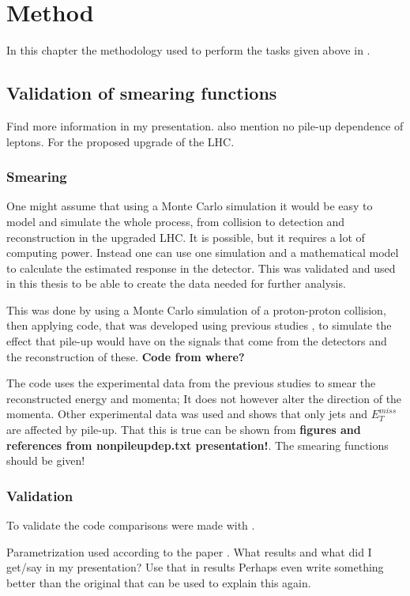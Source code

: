 \chapter{Method}\label{cha:meth}
In this chapter the methodology used to perform the tasks given above in .
\newpage
\section{Validation of smearing functions}
Find more information in my presentation. also mention no pile-up dependence of leptons.
For the proposed upgrade of the LHC.

\subsection{Smearing}
One might assume that using a Monte Carlo simulation it would be easy to model and simulate the whole process, from collision to detection and reconstruction in the upgraded LHC. It is possible, but it requires a lot of computing power. Instead one can use one simulation and a mathematical model to calculate the estimated response in the detector. This was validated and used in this thesis to be able to create the data needed for further analysis. 

This was done by using a Monte Carlo simulation of a proton-proton collision, then applying code, that was developed using previous studies \citep{ATL-PHYS-PUB-2013-004} , to simulate the effect that pile-up would have on the signals that come from the detectors and the reconstruction of these. \textbf{Code from where?}

The code uses the experimental data from the previous studies to smear the reconstructed energy and momenta; It does not however alter the direction of the momenta. Other experimental data was used and shows that only jets and $E^{miss}_T$ are affected by pile-up. That this is true can be shown from \textbf{figures and references from nonpileupdep.txt presentation!}. The smearing functions should be given!

\subsection{Validation}
To validate the code comparisons were made with \citep{ATL-PHYS-PUB-2013-004}. 




Parametrization used according to the paper \citep{ATL-PHYS-PUB-2013-004}. What results and what did I get/say in my presentation? Use that in results Perhaps even write something better than the original that can be used to explain this again.

